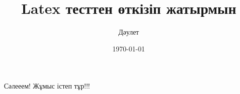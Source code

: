 \documentclass[14pt, a4paper]{article}
\author{Дәулет}
\title{Latex тесттен өткізіп жатырмын}
\date{\today}
\begin{document}
    \maketitle
    Сәлееем! Жұмыс істеп тұр!!!
\end{document}
